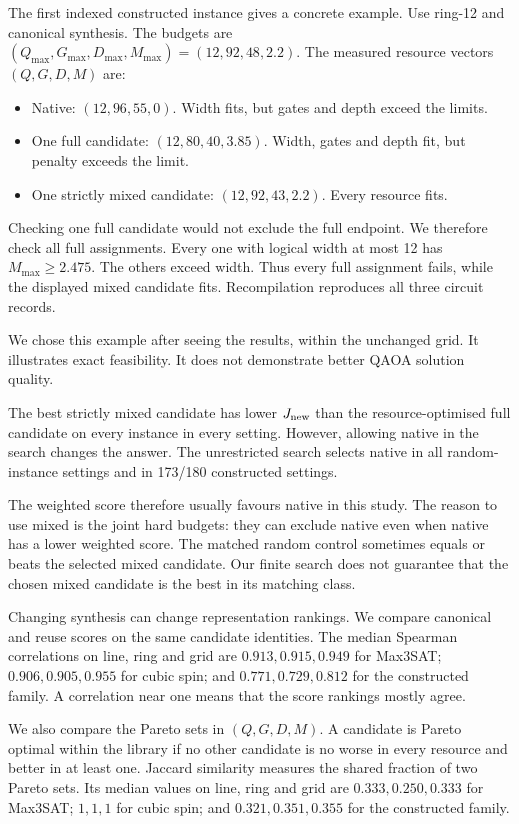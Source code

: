 \documentclass[a4paper,onecolumn,11pt,unpublished]{quantumarticle}
\theoremstyle{remark}
\begin{document}
The first indexed constructed instance gives a concrete example.
Use ring-12 and canonical synthesis. The budgets are
$(Q_{\max},G_{\max},D_{\max},M_{\max})=(12,92,48,2.2)$.
The measured resource vectors $(Q,G,D,M)$ are:
\begin{itemize}
\item Native: $(12,96,55,0)$. Width fits, but gates and depth exceed the limits.
\item One full candidate: $(12,80,40,3.85)$. Width, gates and depth fit,
but penalty exceeds the limit.
\item One strictly mixed candidate: $(12,92,43,2.2)$. Every resource fits.
\end{itemize}
Checking one full candidate would not exclude the full endpoint.
We therefore check all full assignments. Every one with logical width at
most 12 has $M_{\max}\ge2.475$. The others exceed width.
Thus every full assignment fails, while the displayed mixed candidate fits.
Recompilation reproduces all three circuit records.

We chose this example after seeing the results, within the unchanged grid.
It illustrates exact feasibility. It does not demonstrate better QAOA
solution quality.

The best strictly mixed candidate has lower $J_{\rm new}$ than the
resource-optimised full candidate on every instance in every setting.
However, allowing native in the search changes the answer.
The unrestricted search selects native in all random-instance settings
and in 173/180 constructed settings.

The weighted score therefore usually favours native in this study.
The reason to use mixed is the joint hard budgets: they can exclude native
even when native has a lower weighted score.
The matched random control sometimes equals or beats the selected mixed
candidate. Our finite search does not guarantee that the chosen mixed
candidate is the best in its matching class.

Changing synthesis can change representation rankings.
We compare canonical and reuse scores on the same candidate identities.
The median Spearman correlations on line, ring and grid are
$0.913,0.915,0.949$ for Max3SAT; $0.906,0.905,0.955$ for cubic spin;
and $0.771,0.729,0.812$ for the constructed family.
A correlation near one means that the score rankings mostly agree.

We also compare the Pareto sets in $(Q,G,D,M)$.
A candidate is Pareto optimal within the library if no other candidate is
no worse in every resource and better in at least one.
Jaccard similarity measures the shared fraction of two Pareto sets.
Its median values on line, ring and grid are $0.333,0.250,0.333$ for Max3SAT;
$1,1,1$ for cubic spin; and $0.321,0.351,0.355$ for the constructed family.
\end{document}
